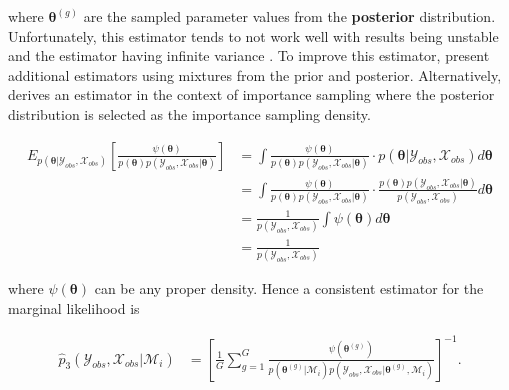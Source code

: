 \documentclass[
  12pt,
]{article}
\begin{document}
where \(\boldsymbol{\theta}^{(g)}\) are the sampled parameter values
from the \textbf{posterior} distribution. Unfortunately, this estimator
tends to not work well with results being unstable and the estimator
having infinite variance
\citep{neal_contribution_1994,robert_computational_2009}. To improve
this estimator, \cite{newton_approximate_1994} present additional
estimators using mixtures from the prior and posterior. Alternatively,
\cite{gelfand_bayesian_1994} derives an estimator in the context of
importance sampling where the posterior distribution is selected as the
importance sampling density.

\vspace{-20px}

\begin{align}
\label{eqn:harmonicmeanimportanceBFderivation}
\nonumber E_{p(\boldsymbol{\theta}|\mathcal{Y}_{obs},\mathcal{X}_{obs})}\left[\frac{\psi(\boldsymbol{\theta})}{p(\boldsymbol{\theta})p(\mathcal{Y}_{obs},\mathcal{X}_{obs}|\boldsymbol{\theta})}\right] & =\int \frac{\psi(\boldsymbol{\theta})}{p(\boldsymbol{\theta})p(\mathcal{Y}_{obs},\mathcal{X}_{obs}|\boldsymbol{\theta})}\cdot p(\boldsymbol{\theta}|\mathcal{Y}_{obs},\mathcal{X}_{obs})d\boldsymbol{\theta}\\
\nonumber & =\int \frac{\psi(\boldsymbol{\theta})}{p(\boldsymbol{\theta})p(\mathcal{Y}_{obs},\mathcal{X}_{obs}|\boldsymbol{\theta})}\cdot\frac{p(\boldsymbol{\theta})p(\mathcal{Y}_{obs},\mathcal{X}_{obs}|\boldsymbol{\theta})}{p(\mathcal{Y}_{obs},\mathcal{X}_{obs})}d\boldsymbol{\theta}\\
\nonumber & =\frac{1}{p(\mathcal{Y}_{obs},\mathcal{X}_{obs})} \int \psi(\boldsymbol{\theta}) d\boldsymbol{\theta}\\
& =\frac{1}{p(\mathcal{Y}_{obs},\mathcal{X}_{obs})}
\end{align} \vspace{-20px}

where \(\psi(\boldsymbol{\theta})\) can be any proper density. Hence a
consistent estimator for the marginal likelihood is

\vspace{-20px}

\begin{align}
\label{eqn:harmonicmeanimportanceBF}
\hat{p}_3(\mathcal{Y}_{obs},\mathcal{X}_{obs}|\mathcal{M}_i) & = \left[\frac{1}{G}\sum_{g=1}^G \frac{\psi(\boldsymbol{\theta}^{(g)})}{p(\boldsymbol{\theta}^{(g)}|\mathcal{M}_i)p(\mathcal{Y}_{obs},\mathcal{X}_{obs}|\boldsymbol{\theta}^{(g)},\mathcal{M}_i)}\right]^{-1}.
\end{align} \vspace{-20px}
\end{document}

